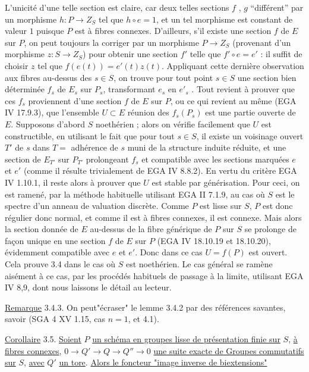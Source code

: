 L'unicité d'une telle section est claire, car deux telles sections $f$ , $g$ ``différent'' par un morphisme $h : P \longrightarrow Z_{S}$ tel que $h \circ e = 1$, et un tel morphisme est constant de valeur $1$ puisque $P$ est à fibres connexes. D'ailleurs, s'il existe une section $f$ de $E$ sur $P$, on peut toujours la corriger par un morphisme $P \longrightarrow Z_{S}$ (provenant d'un morphisme $z : S \longrightarrow Z_{S}$) pour obtenir une section $f'$ telle que $f' \circ e = e'$ : il suffit de choisir $z$ tel que $f(e(t)) = e'(t)z(t)$. Appliquant cette dernière observation aux fibres au-dessus des $s \in S$, on trouve pour tout point $s \in S$ une section bien déterminée $f_{s}$ de $E_{s}$ sur $P_{s}$, transformant $e_{s}$ en $e'_{s}$ . Tout revient à prouver que ces $f_{s}$ proviennent d'une section $f$ de $E$ sur $P$, ou ce qui revient au même (EGA IV 17.9.3), que l'ensemble $U \subset E$ réunion des $f_{s}(P_{s})$ est une partie ouverte de $E$. Supposons d'abord $S$ noethérien ; alors on vérifie facilement que $U$ est constructible, en utilisant le fait que pour tout $s \in S$, il existe un voisinage ouvert $T'$ de $s$ dans $T = {}$ adhérence de $s$ muni de la structure induite réduite, et une section de $E_{T'}$ sur $P_{T'}$ prolongeant $f_{s}$ et compatible avec les sections marquées $e$ et $e'$ (comme il résulte trivialement de EGA IV 8.8.2). En vertu du critère EGA IV 1.10.1, il reste alors à prouver que $U$ est stable par générisation. Pour ceci, on est ramené, par la méthode habituelle utilisant EGA II 7.1.9, au cas où $S$ est le spectre d'un anneau de valuation discrète. Comme $P$ est lisse sur $S$,
$P$ est donc régulier donc normal, et comme il est à fibres connexes, il est connexe. Mais alors la section donnée de $E$ au-dessus de la fibre générique de $P$ sur $S$ se prolonge de façon unique en une section $f$ de $E$ sur $P$ (EGA IV 18.10.19 et 18.10.20), évidemment compatible avec $e$ et $e'$. Donc dans ce cas $U = f(P)$ est ouvert. Cela prouve 3.4 dans le cas où $S$ est noethérien. Le cas général se ramène aisément à ce cas, par les procédés habituels de passage à la limite, utilisant EGA IV 8,9, dont nous laissons le détail au lecteur.

\underline{Remarque} 3.4.3. On peut"écraser" le lemme 3.4.2 par des références savantes, savoir (SGA 4 XV 1.15, cas $n=1$, et 4.1).

\underline{Corollaire} 3.5. \underline{Soient} $P$ \underline{un schéma en groupes lisse de présentation finie sur} $S$, \underline{à fibres connexes}, $0 \longrightarrow Q' \longrightarrow Q \longrightarrow Q'' \longrightarrow 0$ \underline{une suite exacte de Groupes commutatifs sur} $S$, \underline{avec} $Q'$ \underline{un tore}. \underline{Alors le foncteur "image inverse de biextensions"}

